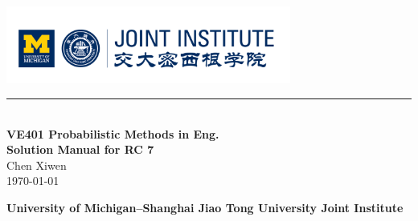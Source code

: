 \documentclass[12pt, a4paper]{article}
\newcommand{\HRule}{\rule{\linewidth}{0.5mm}}
\begin{document}
\renewcommand\arraystretch{1.5}
\setlength\parskip{.1\baselineskip}

\begin{titlepage}
  \begin{center}
  \includegraphics[width=0.7\textwidth]{./logo}\\
  \HRule\\[3cm]

  {\Huge\bfseries VE401 Probabilistic Methods in Eng.\\[0.5cm]Solution Manual for RC 7}\\[2cm]
  
  {\large Chen Xiwen}
  \\[1cm]
  {\large \today}
  \vfill

  \textbf{\small University of Michigan--Shanghai Jiao Tong University Joint Institute}
  \end{center}
\end{titlepage}


\newpage

\begin{spacing}{1.1}




  
\end{spacing}
\end{document}
